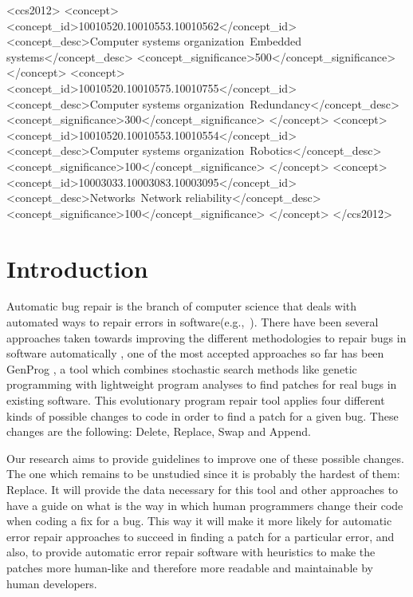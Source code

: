 \documentclass{sig-alternate-05-2015}
\begin{document}
%
%
\begin{CCSXML}
<ccs2012>
 <concept>
  <concept_id>10010520.10010553.10010562</concept_id>
  <concept_desc>Computer systems organization~Embedded systems</concept_desc>
  <concept_significance>500</concept_significance>
 </concept>
 <concept>
  <concept_id>10010520.10010575.10010755</concept_id>
  <concept_desc>Computer systems organization~Redundancy</concept_desc>
  <concept_significance>300</concept_significance>
 </concept>
 <concept>
  <concept_id>10010520.10010553.10010554</concept_id>
  <concept_desc>Computer systems organization~Robotics</concept_desc>
  <concept_significance>100</concept_significance>
 </concept>
 <concept>
  <concept_id>10003033.10003083.10003095</concept_id>
  <concept_desc>Networks~Network reliability</concept_desc>
  <concept_significance>100</concept_significance>
 </concept>
</ccs2012>  
\end{CCSXML}


%
%

%
%
\printccsdesc



\section{Introduction}



Automatic bug repair is the branch of computer science that deals with automated ways to repair errors in software(e.g.,~\cite{kim2013,legoues2012,
  Mechtaev15,Long2016}). There have been several approaches taken towards improving the different methodologies to repair bugs in software automatically \cite{dongsun}\cite{weimer}\cite{claire} \cite{kai}, one of the most accepted approaches so far has been GenProg \cite{weimer}\cite{claire}, a tool which combines stochastic search methods like genetic programming with lightweight program analyses to find patches for real bugs in existing software. This evolutionary program repair tool applies four different kinds of possible changes to code in order to find a patch for a given bug. These changes are the following: Delete, Replace, Swap and Append.

Our research aims to provide guidelines to improve one of these possible changes. The one which remains to be unstudied since it is probably the hardest of them: Replace. It will provide the data necessary for this tool and other approaches to have a guide on what is the way in which human programmers change their code when coding a fix for a bug. This way it will make it more likely for automatic error repair approaches to succeed in finding a patch for a particular error, and also, to provide automatic error repair software with heuristics to make the patches more human-like and therefore more readable and maintainable by human developers.
\end{document}
